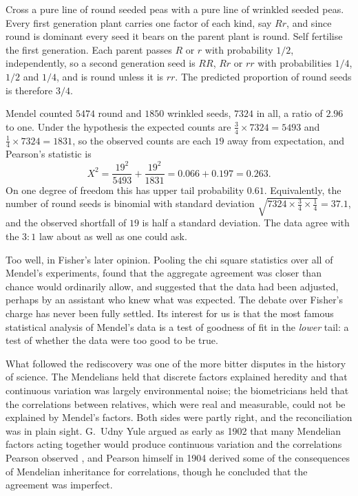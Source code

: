 \begin{example}\label{intro:ex:mendel}
Cross a pure line of round seeded peas with a pure line of wrinkled seeded peas. Every first
generation plant carries one factor of each kind, say $Rr$, and since round is dominant every
seed it bears on the parent plant is round. Self fertilise the first generation. Each parent
passes $R$ or $r$ with probability $1/2$, independently, so a second generation seed is $RR$, $Rr$
or $rr$ with probabilities $1/4$, $1/2$ and $1/4$, and is round unless it is $rr$. The predicted
proportion of round seeds is therefore $3/4$.

Mendel counted $5474$ round and $1850$ wrinkled seeds, $7324$ in all, a ratio of $2.96$ to one.
Under the hypothesis the expected counts are $\tfrac34\times 7324=5493$ and
$\tfrac14\times7324=1831$, so the observed counts are each $19$ away from expectation, and
Pearson's statistic is
\begin{equation*}
X^2=\frac{19^2}{5493}+\frac{19^2}{1831}=0.066+0.197=0.263 .
\end{equation*}
On one degree of freedom this has upper tail probability $0.61$. Equivalently, the number of round
seeds is binomial with standard deviation $\sqrt{7324\times\tfrac34\times\tfrac14}=37.1$, and the
observed shortfall of $19$ is half a standard deviation. The data agree with the $3:1$ law about as
well as one could ask.

Too well, in Fisher's later opinion. Pooling the chi square statistics over all of Mendel's
experiments, \citet{intro:fisher1936} found that the aggregate agreement was closer than chance
would ordinarily allow, and suggested that the data had been adjusted, perhaps by an assistant who
knew what was expected. The debate over Fisher's charge has never been fully settled. Its
interest for us is that the most famous statistical analysis of Mendel's data is a test of
goodness of fit in the \emph{lower} tail: a test of whether the data were too good to be true.
\end{example}

What followed the rediscovery was one of the more bitter disputes in the history of science. The
Mendelians held that discrete factors explained heredity and that continuous variation was largely
environmental noise; the biometricians held that the correlations between relatives, which were
real and measurable, could not be explained by Mendel's factors. Both sides were partly right, and
the reconciliation was in plain sight. G.~Udny Yule argued as early as 1902 that many Mendelian
factors acting together would produce continuous variation and the correlations Pearson observed
\citep{intro:yule1902}, and Pearson himself in 1904 derived some of the consequences of Mendelian
inheritance for correlations, though he concluded that the agreement was imperfect.

